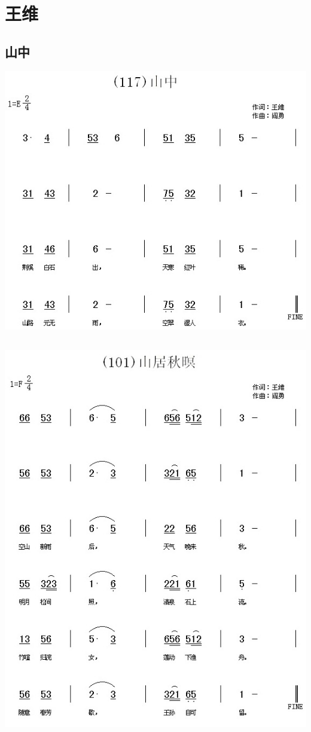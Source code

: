 \documentclass[cn,pad,twocol]{elegantbook}
\begin{document}
\chapter{王维}
\section{山中}
    \includegraphics[width=\textwidth]{dongxiao/20200627-王维-山中.jpg}  
\section{}
    \includegraphics[width=\textwidth]{dongxiao/20200627-王维-山居秋暝.jpg} 
\end{document}
